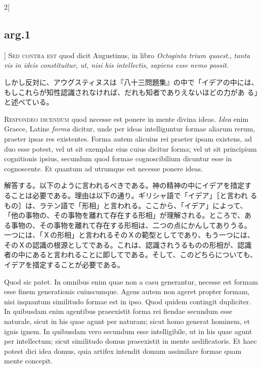 \documentclass[paper=a4paper,fontsize=10pt,jafontsize=9pt,titlepage]{jlreq}
\begin{document}
\begin{paracol}{2}[\subsection{arg.1}]
{\scshape Sed contra est} quod dicit Augustinus, in libro {\itshape
Octoginta trium quaest}., {\itshape tanta vis in ideis constituitur, ut,
nisi his intellectis, sapiens esse nemo possit}.

\switchcolumn

しかし反対に、アウグスティヌスは『八十三問題集』の中で「イデアの中には、
 もしこれらが知性認識されなければ、だれも知者でありえないほどの力があ
 る」と述べている。


{\scshape Respondeo dicendum} quod necesse est ponere in mente divina
ideas. {\itshape Idea} enim Graece, Latine {\itshape forma} dicitur,
unde per ideas intelliguntur formae aliarum rerum, praeter ipsas res
existentes. Forma autem alicuius rei praeter ipsam existens, ad duo
esse potest, vel ut sit exemplar eius cuius dicitur forma; vel ut sit
principium cognitionis ipsius, secundum quod formae cognoscibilium
dicuntur esse in cognoscente. Et quantum ad utrumque est necesse
ponere ideas.

\switchcolumn

解答する。以下のように言われるべきである。神の精神の中にイデアを措定す
ることは必要である。理由は以下の通り。ギリシャ語で「イデア」［と言われ
るもの］は、ラテン語で「形相」と言われる。ここから、「イデア」によって、
「他の事物の、その事物を離れて存在する形相」が理解される。ところで、あ
る事物の、その事物を離れて存在する形相は、二つの点にかんしてありうる。
一つには、「Ｘの形相」と言われるそのＸの範型としてであり、もう一つには、
そのＸの認識の根源としてである。これは、認識されうるものの形相が、認識
者の中にあると言われることに即してである。そして、このどちらについても、
イデアを措定することが必要である。

\switchcolumn*

Quod sic patet. In omnibus enim quae non a casu generantur, necesse
est formam esse finem generationis cuiuscumque. Agens autem non ageret
propter formam, nisi inquantum similitudo formae est in ipso. Quod
quidem contingit dupliciter. In quibusdam enim agentibus praeexistit
forma rei fiendae secundum esse naturale, sicut in his quae agunt per
naturam; sicut homo generat hominem, et ignis ignem. In quibusdam vero
secundum esse intelligibile, ut in his quae agunt per intellectum;
sicut similitudo domus praeexistit in mente aedificatoris. Et haec
potest dici idea domus, quia artifex intendit domum assimilare formae
quam mente concepit.


\end{paracol}
\end{document}

